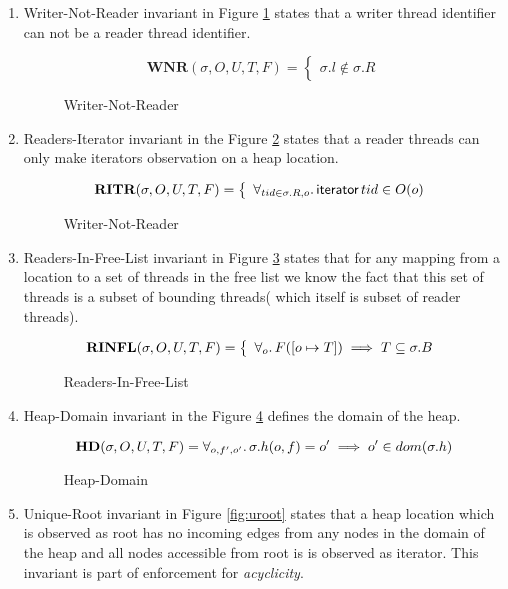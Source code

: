 \begin{enumerate}
\item{Writer-Not-Reader} invariant in Figure \ref{fig:wnr} states that a writer thread identifier can not be a reader thread identifier.
  \begin{figure}[!htb]
    \[
\textbf{WNR}(\sigma,O,U,T,F) =
\left\{
\begin{array}{ll}
 \sigma.l \notin \sigma.R
\end{array}
\right.%
\]
    \caption{Writer-Not-Reader}
\label{fig:wnr}
  \end{figure}
  \item{Readers-Iterator} invariant in the Figure \ref{fig:riter} states that a reader threads can only make \textsf{iterators} observation on a heap location.
  \begin{figure}[!htb]
    \[
\textbf{RITR}(\sigma,O,U,T,F) =
\left\{
\begin{array}{ll}
 \forall_{tid \in \sigma.R,o}\ldotp \textsf{iterator} \, tid \in O(o) 
\end{array}
\right.%
\]
    \caption{Writer-Not-Reader}
\label{fig:riter}
  \end{figure}
\item{Readers-In-Free-List} invariant in Figure \ref{fig:readerinflist} states that for any mapping from a location to a set of threads in the free list we know the fact that  this set of threads is a subset of bounding threads( which itself is subset of reader threads).
\begin{figure}[!htb]
  \[
\textbf{RINFL}(\sigma,O,U,T,F) =
\left\{
\begin{array}{ll}
  \forall_{o} \ldotp F([o \mapsto T]) \implies T \subseteq \sigma.B
\end{array}
\right.%
\]
\caption{Readers-In-Free-List}
\label{fig:readerinflist}
\end{figure}
\item{Heap-Domain} invariant in the Figure \ref{fig:dreachable} defines the domain of the heap.
\begin{figure}[!htb]
\[
\textbf{HD}(\sigma,O,U,T,F) =
\forall_{o,f',o'} \ldotp  \sigma.h(o,f) = o' \implies  o' \in dom(\sigma.h)
\]
    \caption{Heap-Domain}
\label{fig:dreachable}
\end{figure}
\item{Unique-Root} invariant in Figure \ref{fig:uroot} states that a heap location which is observed as \textsf{root} has no incoming edges from any nodes in the domain of the heap and all nodes accessible from root is is observed as \textsf{iterator}. This invariant is part of enforcement for \emph{acyclicity}.

\end{enumerate}
